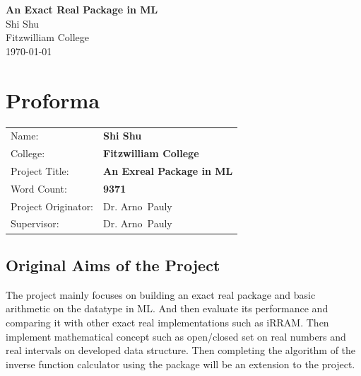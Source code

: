\documentclass[12pt,twoside,notitlepage]{report}
\begin{document}





\pagestyle{empty}


\vspace*{60mm}
\begin{center}
\Huge
{\bf An Exact Real Package in ML} \\
\vspace*{5mm}
Shi Shu \\
\vspace*{5mm}
Fitzwilliam College \\
\vspace*{5mm}
\today  %
\end{center}

\cleardoublepage


\setcounter{page}{1}
\pagestyle{plain}

\chapter*{Proforma}

{\large
\begin{tabular}{ll}
Name:               & \bf Shi Shu                       \\
College:            & \bf Fitzwilliam College                     \\
Project Title:      & \bf An Exreal Package in ML 	\\
Word Count:         & \bf 9371 \\
Project Originator: & Dr. Arno~Pauly                    \\
Supervisor:         & Dr. Arno~Pauly                     \\ 
\end{tabular}
}


\section*{Original Aims of the Project}

The project mainly focuses on building an exact real package and basic arithmetic on the datatype in ML. And then evaluate its performance and comparing it with other exact real implementations such as iRRAM. Then implement mathematical concept such as open/closed set on real numbers and real intervals on developed data structure. Then completing the algorithm of the inverse function calculator using the package will be an extension to the project. 
\end{document}
